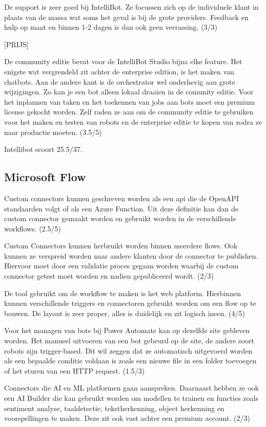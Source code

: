 De support is zeer goed bij IntelliBot. Ze focussen zich op de individuele klant in plaats van de massa wat soms het geval is bij de grote providers. Feedback en hulp op maat en binnen 1-2 dagen is dan ook geen verrassing. (3/3)

[PRIJS]

De community editie bevat voor de IntelliBot Studio bijna elke feature. Het enigste wat vergrendeld zit achter de enterprise edition, is het maken van chatbots. Aan de andere kant is de orchestrator wel onderhevig aan grote wijzigingen. Zo kan je een bot alleen lokaal draaien in de comunity editie. Voor het inplannen van taken en het toekennen van jobs aan bots moet een premium license gekocht worden. Zelf raden ze aan om de community editie te gebruiken voor het maken en testen van robots en de enterprise editie te kopen van zodra ze naar productie moeten. (3.5/5) 

Intellibot scoort 25.5/37.

\subsection{Microsoft Flow}

Custom connectors kunnen geschreven worden als een \acrshort{api} die de OpenAPI standaarden volgt of als een Azure Function. Uit deze definitie kan dan de custom connector gemaakt worden en gebruikt worden in de verschillende workflows. (2.5/5)

Custom Connectors kunnen herbruikt worden binnen meerdere flows. Ook kunnen ze verspreid worden naar andere klanten door de connector te publishen. Hiervoor moet door een validatie proces gegaan worden waarbij de custom connector getest moet worden en nadien gepubliceerd wordt. (2/3)

De tool gebruikt om de workflow te maken is het web platform. Hierbinnen kunnen verschillende triggers en connectoren gebruikt worden om een flow op te bouwen. De layout is zeer proper, alles is duidelijk en zit logisch ineen. (4/5)

Voor het managen van bots bij Power Automate kan op dezelfde site gebleven worden. Het manueel uitvoeren van een bot gebeurd op de site, de andere soort robots zijn trigger-based. Dit wil zeggen dat ze automatisch uitgevoerd worden als een bepaalde conditie voldaan is zoals een nieuwe file in een folder toevoegen of het sturen van een HTTP request. (1.5/3)

Connectors die AI en ML platformen gaan aanspreken. Daarnaast hebben ze ook een AI Builder die kan gebruikt worden om modellen te trainen en functies zoals sentiment analyse, taaldetectie, tekstherkenning, object herkenning en voorspellingen te maken. Deze zit ook vast achter een premium account. (2/3)

